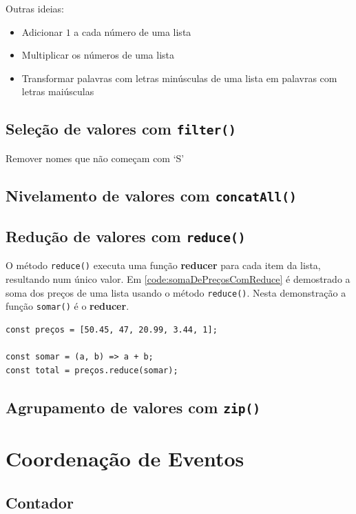 Outras ideias:

\begin{itemize}
\item Adicionar \(1\) a cada número de uma lista
\item Multiplicar os números de uma lista
\item Transformar palavras com letras minúsculas de uma lista em palavras com
letras maiúsculas
\end{itemize}
\subsection{Seleção de valores com \texttt{filter()}}
\label{sec:orgb155416}
Remover nomes que não começam com ‘S’
\subsection{Nivelamento de valores com \texttt{concatAll()}}
\label{sec:org81b4986}
\subsection{Redução de valores com \texttt{reduce()}}
\label{sec:org86f2d66}

O método \texttt{reduce()} executa uma função \textbf{reducer} para cada item da
lista, resultando num único valor. Em \ref{code:somaDePreçosComReduce} é
demostrado a soma dos preços de uma lista usando o método \texttt{reduce()}.
Nesta demonstração a função \texttt{somar()} é o \textbf{reducer}.

\begin{listing}[htbp]
\caption{\label{code:somaDePreçosComReduce}Soma dos preços de uma lista com o método \texttt{reduce()}.}
\begin{verbatim}
const preços = [50.45, 47, 20.99, 3.44, 1];

const somar = (a, b) => a + b;
const total = preços.reduce(somar);
\end{verbatim}
\end{listing}
\subsection{Agrupamento de valores com \texttt{zip()}}
\label{sec:orgde3de35}
\section{Coordenação de Eventos}
\label{sec:org949f4dc}
\subsection{Contador}
\label{sec:orga3f6633}

